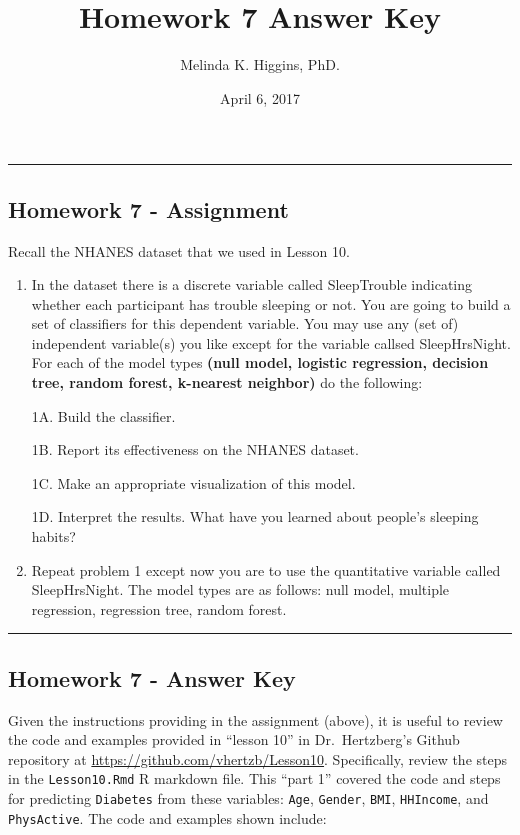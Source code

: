 \documentclass[]{article}
\title{Homework 7 Answer Key}
\author{Melinda K. Higgins, PhD.}
\date{April 6, 2017}
\begin{document}
\maketitle

\begin{center}\rule{0.5\linewidth}{\linethickness}\end{center}

\subsection{Homework 7 - Assignment}\label{homework-7---assignment}

Recall the NHANES dataset that we used in Lesson 10.

\begin{enumerate}
\def\labelenumi{\arabic{enumi}.}
\item
  In the dataset there is a discrete variable called SleepTrouble
  indicating whether each participant has trouble sleeping or not. You
  are going to build a set of classifiers for this dependent variable.
  You may use any (set of) independent variable(s) you like except for
  the variable callsed SleepHrsNight. For each of the model types
  \textbf{(null model, logistic regression, decision tree, random
  forest, k-nearest neighbor)} do the following:

  1A. Build the classifier.

  1B. Report its effectiveness on the NHANES dataset.

  1C. Make an appropriate visualization of this model.

  1D. Interpret the results. What have you learned about people's
  sleeping habits?
\item
  Repeat problem 1 except now you are to use the quantitative variable
  called SleepHrsNight. The model types are as follows: null model,
  multiple regression, regression tree, random forest.
\end{enumerate}

\begin{center}\rule{0.5\linewidth}{\linethickness}\end{center}

\subsection{Homework 7 - Answer Key}\label{homework-7---answer-key}

Given the instructions providing in the assignment (above), it is useful
to review the code and examples provided in ``lesson 10'' in
Dr.~Hertzberg's Github repository at
\url{https://github.com/vhertzb/Lesson10}. Specifically, review the
steps in the \texttt{Lesson10.Rmd} R markdown file. This ``part 1''
covered the code and steps for predicting \texttt{Diabetes} from these
variables: \texttt{Age}, \texttt{Gender}, \texttt{BMI},
\texttt{HHIncome}, and \texttt{PhysActive}. The code and examples shown
include:
\end{document}
